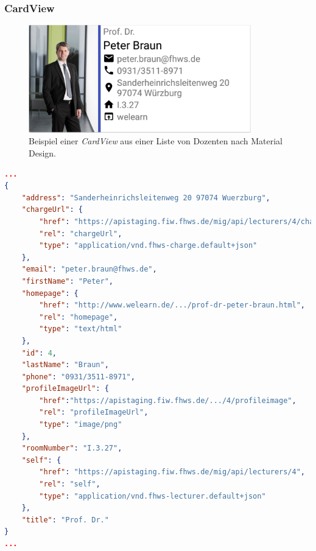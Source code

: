 \subsubsection{CardView}

\begin{figure}[H]
	\begin{center}
		\includegraphics[width=0.86\textwidth]{images/card.png}
		\caption{Beispiel einer \textit{CardView} aus einer Liste von Dozenten nach Material Design.}
		\label{fig:card}
	\end{center}
\end{figure}

\newpage

\begin{lstlisting}[label=lst:braun_json,
language=json,
firstnumber=1,
caption=Demo Daten eines Dozenten.]	
...			   
{
	"address": "Sanderheinrichsleitenweg 20 97074 Wuerzburg",
	"chargeUrl": {
		"href": "https://apistaging.fiw.fhws.de/mig/api/lecturers/4/charges",
		"rel": "chargeUrl",
		"type": "application/vnd.fhws-charge.default+json"
	},
	"email": "peter.braun@fhws.de",
	"firstName": "Peter",
	"homepage": {
		"href": "http://www.welearn.de/.../prof-dr-peter-braun.html",
		"rel": "homepage",
		"type": "text/html"
	},
	"id": 4,
	"lastName": "Braun",
	"phone": "0931/3511-8971",
	"profileImageUrl": {
		"href":"https://apistaging.fiw.fhws.de/.../4/profileimage",
		"rel": "profileImageUrl",
		"type": "image/png"
	},
	"roomNumber": "I.3.27",
	"self": {
		"href": "https://apistaging.fiw.fhws.de/mig/api/lecturers/4",
		"rel": "self",
		"type": "application/vnd.fhws-lecturer.default+json"
	},
	"title": "Prof. Dr."
}
...
\end{lstlisting}

